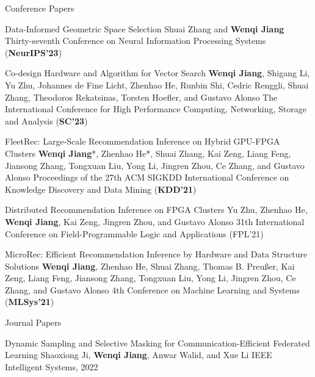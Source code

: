 \begin{rSection}{Conference Papers}
\begin{enumerate}[label={[\arabic*]}]
\item 
\begin{Pub}{Data-Informed Geometric Space Selection}
{Shuai Zhang and \textbf{Wenqi Jiang}}
{Thirty-seventh Conference on Neural Information Processing Systems (\textbf{NeurIPS'23})}
\end{Pub}

\item 
\begin{Pub}{Co-design Hardware and Algorithm for Vector Search}
{\textbf{Wenqi Jiang}, Shigang Li, Yu Zhu, Johannes de Fine Licht, Zhenhao He, Runbin Shi, Cedric Renggli, Shuai Zhang, Theodoros Rekatsinas, Torsten Hoefler, and Gustavo Alonso}
{The International Conference for High Performance Computing, Networking, Storage and Analysis (\textbf{SC'23})}
\end{Pub}

\item 
\begin{Pub}{FleetRec: Large-Scale Recommendation Inference on Hybrid GPU-FPGA Clusters}
{\textbf{Wenqi Jiang}*, Zhenhao He*, Shuai Zhang, Kai Zeng, Liang Feng, Jiansong Zhang, Tongxuan Liu, Yong Li, Jingren Zhou, Ce Zhang, and Gustavo Alonso}
{Proceedings of the 27th ACM SIGKDD International Conference on Knowledge Discovery and Data Mining (\textbf{KDD'21})}
\end{Pub}

\item 
\begin{Pub}{Distributed Recommendation Inference on FPGA Clusters}
{Yu Zhu, Zhenhao He, \textbf{Wenqi Jiang}, Kai Zeng, Jingren Zhou, and Gustavo Alonso}
{31th International Conference on Field-Programmable Logic and Applications (FPL'21)}
\end{Pub}

\item 
\begin{Pub}{MicroRec: Efficient Recommendation Inference by Hardware and Data Structure Solutions}
{\textbf{Wenqi Jiang}, Zhenhao He, Shuai Zhang, Thomas B. Preußer, Kai Zeng, Liang Feng, Jiansong Zhang, Tongxuan Liu, Yong Li, Jingren Zhou, Ce Zhang, and Gustavo Alonso}
{4th Conference on Machine Learning and Systems (\textbf{MLSys'21})}
\end{Pub}\end{enumerate}
\end{rSection}



\begin{rSection}{Journal Papers}
\begin{enumerate}[label={[\arabic*]}]

\item 
\begin{Pub}{Dynamic Sampling and Selective Masking for Communication-Efficient Federated Learning}
{Shaoxiong Ji, \textbf{Wenqi Jiang}, Anwar Walid, and Xue Li}
{IEEE Intelligent Systems, 2022 }
\end{Pub}\end{enumerate}
\end{rSection}




